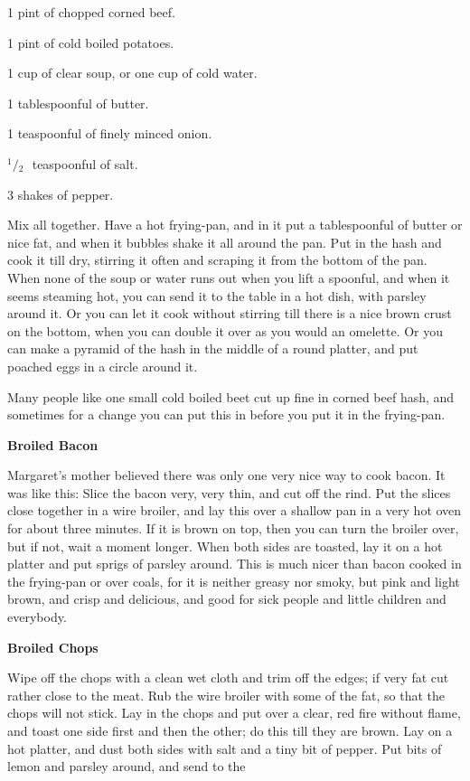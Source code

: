 \documentclass[11pt]{book}
\newcommand{\indpar}{\par\noindent\hspace*{\parindent}}
\newcommand{\ingredient}{\indpar}
\newcommand{\instruction}{\indpar}
\newcommand{\OneHalf}{\ensuremath{{}^1\!\!/\!{}_2\mbox{\ }}}
\newenvironment{RecipeTitle}{\medskip\begin{center}\large\bf }{\end{center}\smallskip}
\begin{document}
\ingredient  1 pint of chopped corned beef.
\ingredient  1 pint of cold boiled potatoes.
\ingredient  1 cup of clear soup, or one cup of cold water.
\ingredient  1 tablespoonful of butter.
\ingredient  1 teaspoonful of finely minced onion.
\ingredient  \OneHalf teaspoonful of salt.
\ingredient  3 shakes of pepper.
\instruction
  Mix all together.  Have a hot frying-pan, and in it put a
tablespoonful of butter or nice fat, and when it bubbles shake it
all around the pan.  Put in the hash and cook it till dry, stirring
it often and scraping it from the bottom of the pan.  When none of
the soup or water runs out when you lift a spoonful, and when it
seems steaming hot, you can send it to the table in a hot dish,
with parsley around it.  Or you can let it cook without stirring
till there is a nice brown crust on the bottom, when you can
double it over as you would an omelette.  Or you can make a pyramid
of the hash in the middle of a round platter, and put poached eggs
in a circle around it.
\instruction
  Many people like one small cold boiled beet cut up fine in corned
beef hash, and sometimes for a change you can put this in before
you put it in the frying-pan.
\begin{RecipeTitle}
Broiled Bacon\label{broiled_bacon} 
\end{RecipeTitle}
\instruction
  Margaret's mother believed there was only one very nice way to
cook bacon.  It was like this:  Slice the bacon very, very thin,
and cut off the rind.  Put the slices close together in a wire
broiler, and lay this over a shallow pan in a very hot oven for
about three minutes.  If it is brown on top, then you can turn the
broiler over, but if not, wait a moment longer.  When both sides
are toasted, lay it on a hot platter and put sprigs of parsley
around.  This is much nicer than bacon cooked in the frying-pan
or over coals, for it is neither greasy nor smoky, but pink
and light brown, and crisp and delicious, and good for sick people
and little children and everybody.
\begin{RecipeTitle}
Broiled Chops\label{broiled_chops}
\end{RecipeTitle}
\instruction
  Wipe off the chops with a clean wet cloth and trim off the edges;
if very fat cut rather close to the meat.  Rub the wire broiler
with some of the fat, so that the chops will not stick.  Lay in
the chops and put over a clear, red fire without flame, and toast
one side first and then the other; do this till they are brown.
Lay on a hot platter, and dust both sides with salt and a tiny bit
of pepper.  Put bits of lemon and parsley around, and send to the
\end{document}
